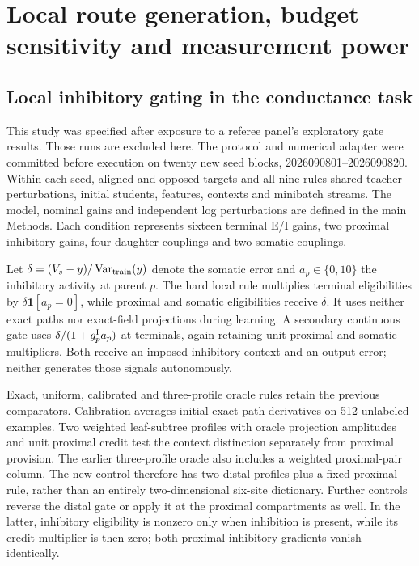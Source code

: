 \clearpage
\section{Local route generation, budget sensitivity and measurement power}
\label{sec:review_followups}

\subsection{Local inhibitory gating in the conductance task}
\label{sec:local_conductance_gate}
This study was specified after exposure to a referee panel's exploratory gate results. Those runs are excluded here. The protocol and numerical adapter were committed before execution on twenty new seed blocks, 2026090801--2026090820. Within each seed, aligned and opposed targets and all nine rules shared teacher perturbations, initial students, features, contexts and minibatch streams. The model, nominal gains and independent log perturbations are defined in the main Methods. Each condition represents sixteen terminal E/I gains, two proximal inhibitory gains, four daughter couplings and two somatic couplings.

Let $\delta=(V_s-y)/\operatorname{Var}_{\rm train}(y)$ denote the somatic error and $a_p\in\{0,10\}$ the inhibitory activity at parent $p$. The hard local rule multiplies terminal eligibilities by $\delta\bm1[a_p=0]$, while proximal and somatic eligibilities receive $\delta$. It uses neither exact paths nor exact-field projections during learning. A secondary continuous gate uses $\delta/(1+g_p^{\rm I}a_p)$ at terminals, again retaining unit proximal and somatic multipliers. Both receive an imposed inhibitory context and an output error; neither generates those signals autonomously.

Exact, uniform, calibrated and three-profile oracle rules retain the previous comparators. Calibration averages initial exact path derivatives on 512 unlabeled examples. Two weighted leaf-subtree profiles with oracle projection amplitudes and unit proximal credit test the context distinction separately from proximal provision. The earlier three-profile oracle also includes a weighted proximal-pair column. The new control therefore has two distal profiles plus a fixed proximal rule, rather than an entirely two-dimensional six-site dictionary. Further controls reverse the distal gate or apply it at the proximal compartments as well. In the latter, inhibitory eligibility is nonzero only when inhibition is present, while its credit multiplier is then zero; both proximal inhibitory gradients vanish identically.

